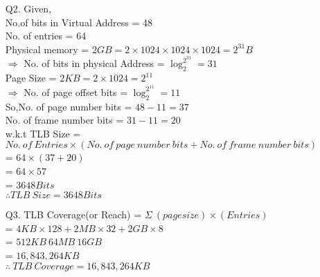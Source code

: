 \documentclass[letterpaper]{article}
\begin{document}
\begin{large}
\begin{flushleft}
\begin{enumerate}
\item[Q2. ]Given,\\[0.1in]
No.of bits in Virtual Address = 48\\[0.1in]
No. of entries = 64\\[0.1in]
Physical memory = $2GB = 2 \times 1024 \times 1024 \times 1024 = 2^{31} B$\\[0.1in] 
$\Rightarrow$ No. of bits in physical Address = $\log_2^{2^{31}} = 31$\\[0.1in]
Page Size = $2KB = 2 \times 1024 = 2^{11}$\\[0.1in]
$\Rightarrow$ No. of page offset bits = $\log_2^{2^{11}} = 11$\\[0.1in]
So,No. of page number bits = $48-11 = 37$\\[0.1in]
\quad No. of frame number bits = $31-11 = 20$\\[0.1in]
w.k.t TLB Size = $No.\ of\ Entries \times (No.\ of\ page\ number\ bits + No.\ of\ frame\ number\ bits) $\\[0.1in]
\qquad\qquad\qquad\:\:\:\!\! = $64 \times (37 + 20)$\\[0.1in]
\qquad\qquad\qquad\:\:\:\!\! = $64 \times 57$\\[0.1in]
\qquad\qquad\qquad\:\:\:\!\! = $3648 Bits$\\[0.1in] 
$\boxed{\therefore TLB\ Size = 3648 Bits}$\\[0.2in]

\item[Q3. ]TLB Coverage(or Reach) = $\Sigma\ (page size) \times (Entries)$\\[0.1in]
\qquad\qquad\qquad\qquad\qquad\quad = $4KB \times 128 + 2MB \times 32 + 2GB \times 8$\\[0.1in]
\qquad\qquad\qquad\qquad\qquad\quad = $512KB\ 64MB\ 16GB$\\[0.1in]
\qquad\qquad\qquad\qquad\qquad\quad = $16,843,264KB$\\[0.1in]
$\boxed{\therefore\ TLB\ Coverage = 16,843,264KB}$
\clearpage


\end{enumerate}
\end{flushleft}
\end{large}
\end{document}
